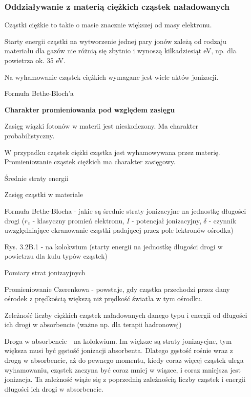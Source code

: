 \documentclass{article}
\begin{document}
\subsubsection{Oddziaływanie z materią ciężkich cząstek naładowanych}

Cząstki ciężkie to takie o masie znacznie większej od masy elektronu.

Starty energii cząstki na wytworzenie jednej pary jonów zależą od rodzaju materiału dla gazów nie różnią się zbytnio i wynoszą kilkadziesiąt eV, np. dla powietrza ok. 35 eV.

Na wyhamowanie cząstek ciężkich wymagane jest wiele aktów jonizacji.

Formuła Bethe-Bloch'a

\textbf{Charakter promieniowania pod względem zasięgu}

Zasięg wiązki fotonów w materii jest nieskończony. Ma charakter probabilistyczny.

W przypadku cząstek ciężki cząstka jest wyhamowywana przez materię. Promieniowanie cząstek ciężkich ma charakter zasięgowy.

Średnie straty energii

Zasięg cząstki w materiale

Formuła Bethe-Blocha - jakie są średnie straty jonizacyjne na jednostkę długości drogi ($r_e$ - klasyczny promień elektronu, $I$ - potencjał jonizacyjny, $\delta$ - czynnik uwzględniające ekranowanie cząstki padającej przez pole lektronów ośrodka)

Rys. 3.2B.1 - na kolokwium (starty energii na jednostkę długości drogi w powietrzu dla kulu typów cząstek)

Pomiary strat jonizayjnych

Promieniowanie Czerenkowa - powstaje, gdy cząstka przechodzi przez dany ośrodek z prędkością większą niż prędkość światła w tym ośrodku.

Zeleżność liczby ciężkich cząstek naładowanych danego typu i energii od długości ich drogi w absorbencie (ważne np. dla terapii hadronowej)

Droga w absorbencie - na kolokwium. Im większe są straty jonizaycjne, tym większa musi być gęstość jonizacji absorbenta. Dlatego gęstość rośnie wraz z drogą w absorbencie, aż do pewnego momentu, kiedy coraz więcej cząstek ulega wyhamowaniu, cząstek zaczyna być coraz mniej w wiązce, i coraz mniejsza jest jonizacja. Ta zależność wiąże się z poprzednią zależnością liczby cząstek i energii długości ich drogi w absorbencie.
\end{document}
